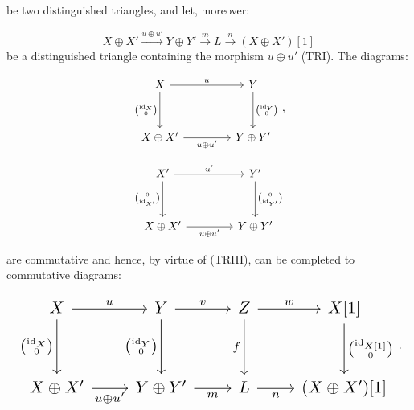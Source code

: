 \clearpage
{}%
\begingroup
\small
\setlength{\abovedisplayskip}{4pt plus 2pt minus 2pt}%
\setlength{\belowdisplayskip}{4pt plus 2pt minus 2pt}%

be two distinguished triangles, and let, moreover:

\[
  X\oplus X'\xrightarrow{u\oplus u'}Y\oplus Y'
  \xrightarrow{m}L\xrightarrow{n}(X\oplus X')[1]
\]
be a distinguished triangle containing the morphism $u\oplus u'$ (TRI).
The diagrams:

\begin{equation*}
  \begin{tikzcd}[column sep=4.2em,row sep=3.2em]
    X \arrow[r,"u"] \arrow[d,"{\binom{\operatorname{id}_X}{0}}"']
      & Y \arrow[d,"{\binom{\operatorname{id}_Y}{0}}"] \\
    X\oplus X' \arrow[r,"{u\oplus u'}"']
      & Y\oplus Y'
  \end{tikzcd}
  \,,
\end{equation*}

\begin{equation*}
  \begin{tikzcd}[column sep=4.2em,row sep=3.2em]
    X' \arrow[r,"{u'}"] \arrow[d,"{\binom{0}{\operatorname{id}_{X'}}}"']
      & Y' \arrow[d,"{\binom{0}{\operatorname{id}_{Y'}}}"] \\
    X\oplus X' \arrow[r,"{u\oplus u'}"']
      & Y\oplus Y'
  \end{tikzcd}
\end{equation*}

are commutative and hence, by virtue of (TRIII), can be completed to
commutative diagrams:

\begin{equation*}
  \resizebox{0.98\linewidth}{!}{%
    $\begin{tikzcd}[ampersand replacement=\&,column sep=2.25em,row sep=3.1em]
      X \arrow[r,"u"] \arrow[d,"{\binom{\operatorname{id}_X}{0}}"']
        \& Y \arrow[r,"v"] \arrow[d,"{\binom{\operatorname{id}_Y}{0}}"']
        \& Z \arrow[r,"w"] \arrow[d,"f"']
        \& X[1] \arrow[d,"{\binom{\operatorname{id}_{X[1]}}{0}}"] \\
      X\oplus X' \arrow[r,"{u\oplus u'}"']
        \& Y\oplus Y' \arrow[r,"m"']
        \& L \arrow[r,"n"']
        \& (X\oplus X')[1]
    \end{tikzcd}$%
  }\,.
\end{equation*}

